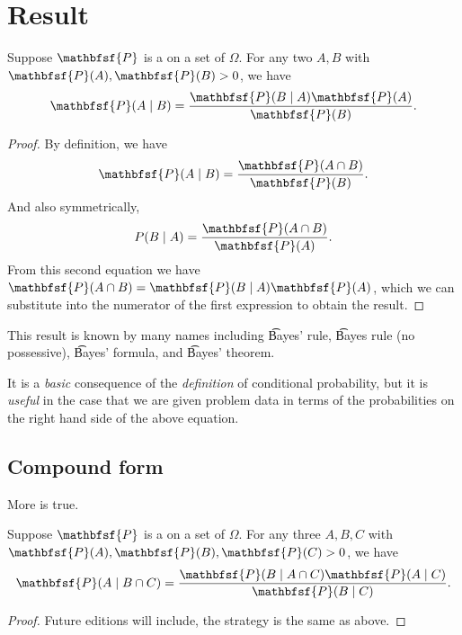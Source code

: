 

\section*{Result}

\begin{proposition}
Suppose $\mathbfsf{P} $ is a on a set of $\Omega $.
For any two $A, B$ with $\mathbfsf{P} (A), \mathbfsf{P} (B) > 0$, we have
\[
\mathbfsf{P} (A \mid  B) = \frac{ \mathbfsf{P} (B \mid A)\mathbfsf{P} (A) }{ \mathbfsf{P} (B) }.
\]
\begin{proof}By definition, we have
\[
\mathbfsf{P} (A \mid  B) = \frac{ \mathbfsf{P} (A \cap  B) }{ \mathbfsf{P} (B) }.
\]
And also symmetrically,
\[
P(B \mid  A) = \frac{ \mathbfsf{P} (A \cap  B) }{ \mathbfsf{P} (A) }.
\]
From this second equation we have $\mathbfsf{P} (A \cap  B) = \mathbfsf{P} (B \mid  A) \mathbfsf{P} (A)$, which we can substitute into the numerator of the first expression to obtain the result.\end{proof}
\end{proposition}

This result is known by many names including \t{Bayes' rule}, \t{Bayes rule} (no possessive), \t{Bayes' formula}, and \t{Bayes' theorem}.

It is a \textit{basic} consequence of the \textit{definition} of conditional probability, but it is \textit{useful} in the case that we are given problem data in terms of the probabilities on the right hand side of the above equation.

\subsection*{Compound form}

More is true.

\begin{proposition}
Suppose $\mathbfsf{P} $ is a on a set of $\Omega $.
For any three $A, B, C$ with $\mathbfsf{P} (A), \mathbfsf{P} (B), \mathbfsf{P} (C) > 0$, we have
\[
\mathbfsf{P} (A \mid  B \cap  C) = \frac{ \mathbfsf{P} (B \mid A \cap  C)\mathbfsf{P} (A \mid  C) }{ \mathbfsf{P} (B \mid  C) }.
\]
\begin{proof}Future editions will include, the strategy is the same as above.\end{proof}
\end{proposition}

\blankpage